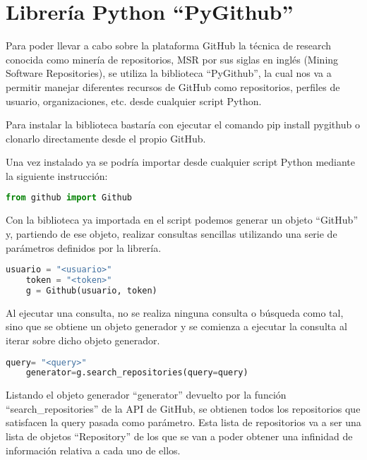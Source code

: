 \section{Librería Python ``PyGithub''}

Para poder llevar a cabo sobre la plataforma GitHub la técnica de research conocida como minería de repositorios, MSR por sus siglas en inglés (Mining Software Repositories), se utiliza la biblioteca ``PyGithub'', la cual nos va a permitir manejar diferentes recursos de GitHub como repositorios, perfiles de usuario, organizaciones, etc. desde cualquier script Python.

Para instalar la biblioteca bastaría con ejecutar el comando pip install pygithub o clonarlo directamente desde el propio GitHub.

Una vez instalado ya se podría importar desde cualquier script Python mediante la siguiente instrucción:

\begin{lstlisting}[language=Python]
    from github import Github
\end{lstlisting}

Con la biblioteca ya importada en el script podemos generar un objeto ``GitHub'' y, partiendo de ese objeto, realizar consultas sencillas utilizando una serie de parámetros definidos por la librería.

\begin{lstlisting}[language=Python, caption=Autenticación en API de GitHub]
    usuario = "<usuario>" 
    token = "<token>"
    g = Github(usuario, token)
\end{lstlisting}

Al ejecutar una consulta, no se realiza ninguna consulta o búsqueda como tal, sino que se obtiene un objeto generador y se comienza a ejecutar la consulta al iterar sobre dicho objeto generador.

\begin{lstlisting}[language=Python]
    query= "<query>" 
    generator=g.search_repositories(query=query)
\end{lstlisting}



Listando el objeto generador ``generator'' devuelto por la función ``search\_repositories'' de la API de GitHub, se obtienen todos los repositorios que satisfacen la query pasada como parámetro. Esta lista de repositorios va a ser una lista de objetos “Repository” de los que se van a poder obtener una infinidad de información relativa a cada uno de ellos.

